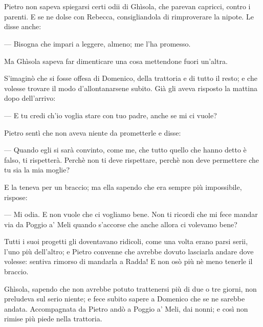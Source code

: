 \chapter{}

Pietro non sapeva spiegarsi certi odii di Ghìsola, che parevan capricci, contro i parenti. E se ne dolse con Rebecca, consigliandola di rimproverare la nipote. Le disse anche:

— Bisogna che impari a leggere, almeno; me l'ha promesso.

Ma Ghìsola sapeva far dimenticare una cosa mettendone fuori un'altra.

S'imaginò che si fosse offesa di Domenico, della trattoria e di tutto il resto; e che volesse trovare il modo d'allontanarsene subito. Già gli aveva risposto la mattina dopo dell'arrivo:

— E tu credi ch'io voglia stare con tuo padre, anche se mi ci vuole?

Pietro sentì che non aveva niente da prometterle e disse:

— Quando egli si sarà convinto, come me, che tutto quello che hanno detto è falso, ti rispetterà. Perchè non ti deve rispettare, perchè non deve permettere che tu sia la mia moglie?

E la teneva per un braccio; ma ella sapendo che era sempre più impossibile, rispose:

— Mi odia. E non vuole che ci vogliamo bene. Non ti ricordi che mi fece mandar via da Poggio a' Meli quando s'accorse che anche allora ci volevamo bene?

Tutti i suoi progetti gli doventavano ridicoli, come una volta erano parsi serii, l'uno più dell'altro; e Pietro convenne che avrebbe dovuto lasciarla andare dove volesse: sentiva rimorso di mandarla a Radda! E non osò più nè meno tenerle il braccio.

Ghìsola, sapendo che non avrebbe potuto trattenersi più di due o tre giorni, non preludeva sul serio niente; e fece subito sapere a Domenico che se ne sarebbe andata. Accompagnata da Pietro andò a Poggio a' Meli, dai nonni; e così non rimise più piede nella trattoria.
